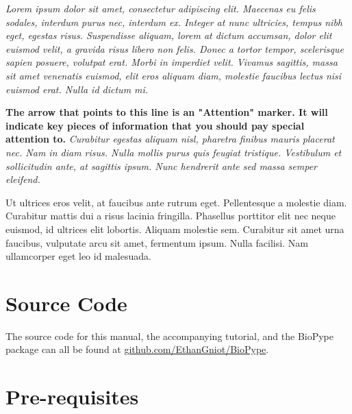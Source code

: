 \textit{Lorem ipsum dolor sit amet, consectetur adipiscing elit. Maecenas eu felis sodales, interdum purus nec, interdum ex. Integer at nunc  ultricies, tempus nibh eget, egestas risus. Suspendisse aliquam, lorem at dictum accumsan, dolor elit euismod velit, a gravida risus libero non felis. Donec a tortor tempor, scelerisque sapien posuere, volutpat erat. Morbi in imperdiet velit. Vivamus sagittis, massa sit amet venenatis euismod, elit eros aliquam diam, molestie faucibus lectus nisi euismod erat. Nulla id dictum mi.}

\attention \textbf{The arrow that points to this line is an "Attention" marker. It will indicate key pieces of information that you should pay special attention to.} \textit{Curabitur egestas aliquam nisl, pharetra finibus mauris placerat nec. Nam in diam risus. Nulla mollis purus quis feugiat tristique. Vestibulum et sollicitudin ante, at sagittis ipsum. Nunc hendrerit ante sed massa semper eleifend.}

 Ut ultrices eros velit, at faucibus ante rutrum eget. Pellentesque a molestie diam. Curabitur mattis dui a risus lacinia fringilla. Phasellus porttitor elit nec neque euismod, id ultrices elit lobortis. Aliquam molestie sem. Curabitur sit amet urna faucibus, vulputate arcu sit amet, fermentum ipsum. Nulla facilisi. Nam ullamcorper eget leo id malesuada.


\section{Source Code}
The source code for this manual, the accompanying tutorial, and the BioPype package can all be found at \url{github.com/EthanGniot/BioPype}.
\section{Pre-requisites}
